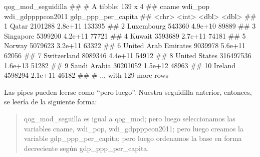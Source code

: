 \documentclass[]{book}
\newenvironment{Shaded}{\begin{snugshade}}{\end{snugshade}}
\newcommand{\KeywordTok}[1]{\textcolor[rgb]{0.13,0.29,0.53}{\textbf{#1}}}
\newcommand{\DataTypeTok}[1]{\textcolor[rgb]{0.13,0.29,0.53}{#1}}
\newcommand{\StringTok}[1]{\textcolor[rgb]{0.31,0.60,0.02}{#1}}
\newcommand{\OperatorTok}[1]{\textcolor[rgb]{0.81,0.36,0.00}{\textbf{#1}}}
\newcommand{\NormalTok}[1]{#1}
\begin{document}
\begin{Shaded}
\end{Shaded}

\begin{Shaded}
\begin{Highlighting}[]
\NormalTok{qog_mod_seguidilla}
\NormalTok{## # A tibble: 139 x 4}
\NormalTok{##                   cname   wdi_pop wdi_gdppppcon2011 gdp_ppp_per_capita}
\NormalTok{##                   <chr>     <int>             <dbl>              <dbl>}
\NormalTok{##  1                Qatar   2101288           2.8e+11             133395}
\NormalTok{##  2           Luxembourg    543360           4.9e+10              89889}
\NormalTok{##  3            Singapore   5399200           4.2e+11              77721}
\NormalTok{##  4               Kuwait   3593689           2.7e+11              74181}
\NormalTok{##  5               Norway   5079623           3.2e+11              63322}
\NormalTok{##  6 United Arab Emirates   9039978           5.6e+11              62056}
\NormalTok{##  7          Switzerland   8089346           4.4e+11              54912}
\NormalTok{##  8        United States 316497536           1.6e+13              51282}
\NormalTok{##  9         Saudi Arabia  30201052           1.5e+12              48963}
\NormalTok{## 10              Ireland   4598294           2.1e+11              46182}
\NormalTok{## # ... with 129 more rows}
\end{Highlighting}
\end{Shaded}

Las pipes pueden leerse como ``pero luego''. Nuestra seguidilla
anterior, entonces, se leería de la siguiente forma:

\begin{quote}
qog\_mod\_seguilla es igual a qog\_mod; pero luego seleccionamos las
variables cname, wdi\_pop, wdi\_gdppppcon2011; pero luego creamos la
variable gdp\_ppp\_per\_capita; pero luego ordenamos la base en forma
decreciente según gdp\_ppp\_per\_capita.
\end{quote}
\end{document}
